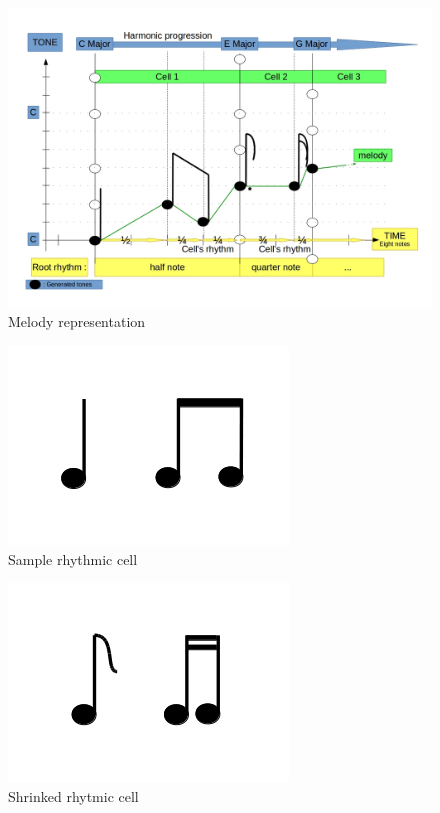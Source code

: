 \documentclass[twocolumn, 11pt]{article}
\begin{document}
\onecolumn
\begin{figure}
  \includegraphics[width=\textwidth]{concept}
  \caption{Melody representation}
  \label{fig:concept}
\end{figure}
\twocolumn


\begin{figure}[h]
  \centering
  \includegraphics[scale=0.4]{ncc}
  \caption{Sample rhythmic cell}
  \label{fig:ncc}
\end{figure}

\begin{figure}[h]
  \centering
  \includegraphics[scale=0.4]{cdcdc}
  \caption{Shrinked rhytmic cell}
  \label{fig:cdcdc}
\end{figure}
\end{document}
